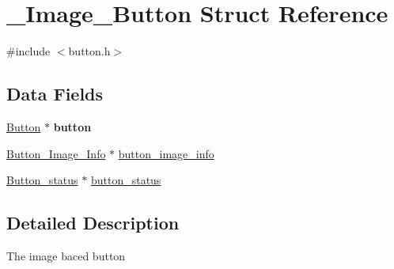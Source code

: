 \hypertarget{struct___image___button}{\section{\+\_\+\+Image\+\_\+\+Button Struct Reference}
\label{struct___image___button}
}


{\ttfamily \#include $<$button.\+h$>$}

\subsection*{Data Fields}
\begin{DoxyCompactItemize}
\item 
\hypertarget{struct___image___button_afcbb5b54142bac4e305b31cbebe41064}{\hyperlink{struct___button}{Button} $\ast$ {\bfseries button}}\label{struct___image___button_afcbb5b54142bac4e305b31cbebe41064}

\item 
\hyperlink{struct___button___image___info}{Button\+\_\+\+Image\+\_\+\+Info} $\ast$ \hyperlink{struct___image___button_abe7ec1033c8966c23ea31920649178bf}{button\+\_\+image\+\_\+info}
\item 
\hyperlink{struct__button__status}{Button\+\_\+status} $\ast$ \hyperlink{struct___image___button_af1ab6c7287e67a55a8e855e08302f8be}{button\+\_\+status}
\end{DoxyCompactItemize}


\subsection{Detailed Description}
The image baced button 

